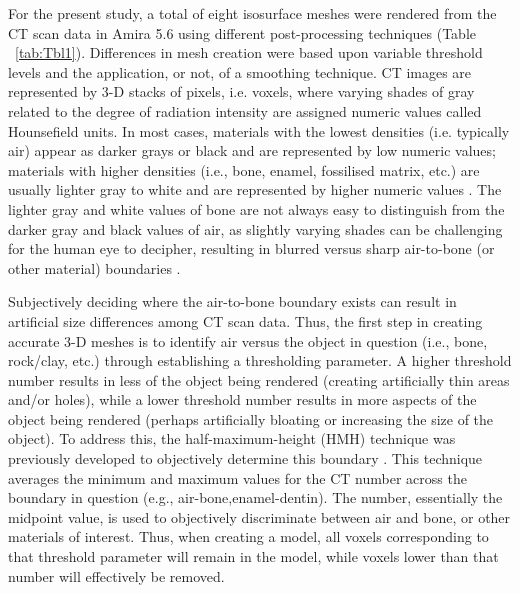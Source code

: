 \documentclass[review]{elsarticle}
\begin{document}
For the present study, a total of eight isosurface meshes were rendered from the CT scan data in Amira 5.6 \citep{RN5898} using different post-processing techniques (Table ~\ref{tab:Tbl1}). Differences in mesh creation were based upon variable threshold levels and the application, or not, of a smoothing technique. CT images are represented by 3-D stacks of pixels, i.e. voxels, where varying shades of gray related to the degree of radiation intensity are assigned numeric values called Hounsefield units. In most cases, materials with the lowest densities (i.e. typically air) appear as darker grays or black and are represented by low numeric values; materials with higher densities (i.e., bone, enamel, fossilised matrix, etc.) are usually lighter gray to white and are represented by higher numeric values \citep{RN11484,RN11482}. The lighter gray and white values of bone are not always easy to distinguish from the darker gray and black values of air, as slightly varying shades can be challenging for the human eye to decipher, resulting in blurred versus sharp air-to-bone (or other material) boundaries \citep{RN11478}. 

Subjectively deciding where the air-to-bone boundary exists can result in artificial size differences among CT scan data. Thus, the first step in creating accurate 3-D meshes is to identify air versus the object in question (i.e., bone, rock/clay, etc.) through establishing a thresholding parameter. A higher threshold number results in less of the object being rendered (creating artificially thin areas and/or holes), while a lower threshold number results in more aspects of the object being rendered (perhaps artificially bloating or increasing the size of the object). To address this, the half-maximum-height (HMH) technique was previously developed to objectively determine this boundary \citep{RN11483,RN11485,RN11486}. This technique averages the minimum and maximum values for the CT number across the boundary in question (e.g., air-bone,enamel-dentin). The number, essentially the midpoint value, is used to objectively discriminate between air and bone, or other materials of interest. Thus, when creating a model, all voxels corresponding to that threshold parameter will remain in the model, while voxels lower than that number will effectively be removed. 
\end{document}
